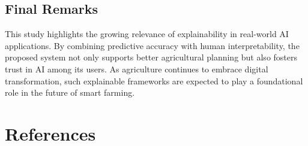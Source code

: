 \documentclass[a4paper,11pt,oneside]{book}
\begin{document}
\section{Final Remarks}

This study highlights the growing relevance of explainability in real-world AI applications. By combining predictive accuracy with human interpretability, the proposed system not only supports better agricultural planning but also fosters trust in AI among its users. As agriculture continues to embrace digital transformation, such explainable frameworks are expected to play a foundational role in the future of smart farming.

\newpage


\chapter*{References}
\end{document}
